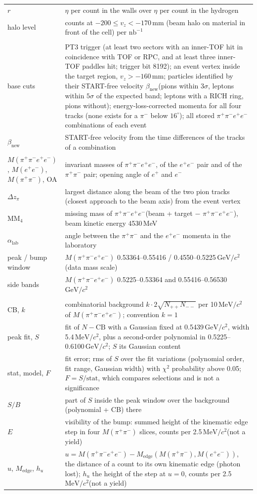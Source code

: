 \documentclass[11pt,a4paper]{article}
\newcommand{\pim}{\ensuremath{\pi^{-}}\xspace}
\newcommand{\ee}{\ensuremath{e^{+}e^{-}}\xspace}
\newcommand{\pipi}{\ensuremath{\pi^{+}\pi^{-}}\xspace}
\newcommand{\ppee}{\ensuremath{\pi^{+}\pi^{-}e^{+}e^{-}}\xspace}
\newcommand{\Mfour}{\ensuremath{M(\pi^{+}\pi^{-}e^{+}e^{-})}\xspace}
\newcommand{\Mee}{\ensuremath{M(e^{+}e^{-})}\xspace}
\newcommand{\Mpipi}{\ensuremath{M(\pi^{+}\pi^{-})}\xspace}
\newcommand{\betanew}{\ensuremath{\beta_{\mathrm{new}}}\xspace}
\newcommand{\nbinv}{\ensuremath{\mathrm{nb}^{-1}}\xspace}
\newcommand{\GeVcc}{\ensuremath{\mathrm{GeV}/c^{2}}\xspace}
\newcommand{\MeVcc}{\ensuremath{\mathrm{MeV}/c^{2}}\xspace}
\newcommand{\MMfour}{\ensuremath{\mathrm{MM}_4}\xspace}
\newcommand{\dzpi}{\ensuremath{\Delta z_\pi}\xspace}
\newcommand{\alab}{\ensuremath{\alpha_{\mathrm{lab}}}\xspace}
\newcommand{\vz}{\ensuremath{v_z}\xspace}
\newcommand{\Medge}{\ensuremath{M_{\mathrm{edge}}}\xspace}%
\newcommand{\selptthree}{PT3 trigger (at least two sectors with an inner-TOF hit in coincidence with TOF or RPC, and at least three
inner-TOF paddles hit; trigger bit 8192)\xspace}
\newcommand{\selpid}{particles identified by their START-free velocity \betanew (pions within $3\sigma$, leptons within $5\sigma$ of the
expected band; leptons with a RICH ring, pions without)\xspace}
\newcommand{\selcor}{energy-loss-corrected momenta for all four tracks (none exists for a \pim below $16^\circ$)\xspace}
\newcommand{\selall}{all stored \ppee combinations of each event\xspace}
\newcommand{\selbase}{\selptthree; an event vertex inside the target region, $\vz>-160$\,mm; \selpid; \selcor; \selall}
\begin{document}
{\begin{longtable}{@{}>{\raggedright\arraybackslash}p{3.3cm} >{\raggedright\arraybackslash}p{\dimexpr\textwidth-3.3cm-2\tabcolsep\relax}@{}}
$r$ & $\eta$ per count in the walls over $\eta$ per count in the hydrogen \\
halo level & counts at $-200\le\vz<-170$\,mm (beam halo on material in front of the cell) per \nbinv \\
\midrule
\multicolumn{2}{@{}l}{\textbf{Selection}} \\
base cuts & \selbase \\
\betanew & START-free velocity from the time differences of the tracks of a combination \\
\Mfour, \Mee, \Mpipi, OA & invariant masses of \ppee, of the \ee pair and of the \pipi pair; opening angle of $e^+$ and $e^-$ \\
\dzpi & largest distance along the beam of the two pion tracks (closest approach to the beam axis) from the event vertex \\
\MMfour & missing mass of \ppee (beam + target $-$ \ppee), beam kinetic energy 4530\,MeV \\
\alab & angle between the \pipi and the \ee momenta in the laboratory \\
peak / bump window & \Mfour 0.53364--0.55416 / 0.4550--0.5225\,\GeVcc (data mass scale) \\
side bands & \Mfour 0.5225--0.53364 and 0.55416--0.56530\,\GeVcc \\
\midrule
\multicolumn{2}{@{}l}{\textbf{Background and signal measures}} \\
CB, $k$ & combinatorial background $k\cdot2\sqrt{N_{++}N_{--}}$ per 10\,\MeVcc of \Mfour; convention $k=1$ \\
peak fit, $S$ & fit of $N-\mathrm{CB}$ with a Gaussian fixed at 0.5439\,\GeVcc, width 5.4\,\MeVcc, plus a second-order polynomial in
   0.5225--0.6100\,\GeVcc; $S$ its Gaussian content \\
stat, model, $F$ & fit error; rms of $S$ over the fit variations (polynomial order, fit range, Gaussian width) with $\chi^2$ probability above 0.05; $F=S/\mathrm{stat}$, which compares selections and is not a significance \\
$S/B$ & part of $S$ inside the peak window over the background (polynomial + CB) there \\
$E$ & visibility of the bump: summed height of the kinematic edge step in four \Mpipi slices, counts per 2.5\,\MeVcc (not a yield) \\
$u$, \Medge, $h_u$ & $u=\Mfour-\Medge(\Mpipi,\Mee)$, the distance of a count to its own kinematic edge (photon lost); $h_u$ the height of the step at $u=0$, counts per 2.5\,\MeVcc (not a yield) \\

\end{longtable}}
\end{document}

